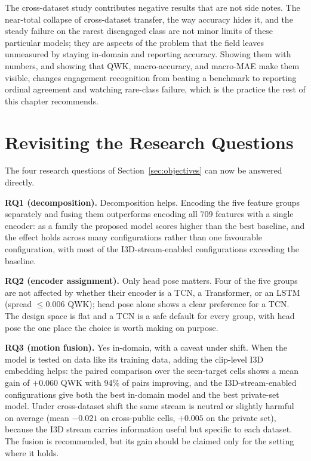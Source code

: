 \documentclass[../main.tex]{subfiles}
\begin{document}
The cross-dataset study contributes negative results that are not side notes. The near-total collapse of cross-dataset transfer, the way accuracy hides it, and the steady failure on the rarest disengaged class are not minor limits of these particular models; they are aspects of the problem that the field leaves unmeasured by staying in-domain and reporting accuracy. Showing them with numbers, and showing that QWK, macro-accuracy, and macro-MAE make them visible, changes engagement recognition from beating a benchmark to reporting ordinal agreement and watching rare-class failure, which is the practice the rest of this chapter recommends.

\FloatBarrier
\section{Revisiting the Research Questions}
\label{sec:rq-revisit}

The four research questions of Section~\ref{sec:objectives} can now be answered directly.

\textbf{RQ1 (decomposition).}
Decomposition helps. Encoding the five feature groups separately and fusing them outperforms encoding all 709 features with a single encoder: as a family the proposed model scores higher than the best baseline, and the effect holds across many configurations rather than one favourable configuration, with most of the I3D-stream-enabled configurations exceeding the baseline.

\textbf{RQ2 (encoder assignment).}
Only head pose matters. Four of the five groups are not affected by whether their encoder is a TCN, a Transformer, or an LSTM (spread $\le0.006$ QWK); head pose alone shows a clear preference for a TCN. The design space is flat and a TCN is a safe default for every group, with head pose the one place the choice is worth making on purpose.

\textbf{RQ3 (motion fusion).}
Yes in-domain, with a caveat under shift. When the model is tested on data like its training data, adding the clip-level I3D embedding helps: the paired comparison over the seen-target cells shows a mean gain of $+0.060$ QWK with 94\% of pairs improving, and the I3D-stream-enabled configurations give both the best in-domain model and the best private-set model. Under cross-dataset shift the same stream is neutral or slightly harmful on average (mean $-0.021$ on cross-public cells, $+0.005$ on the private set), because the I3D stream carries information useful but specific to each dataset. The fusion is recommended, but its gain should be claimed only for the setting where it holds.
\end{document}
